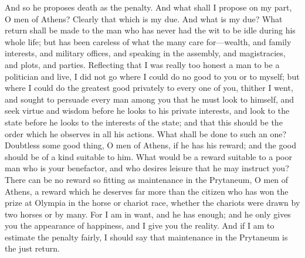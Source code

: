 \documentclass[11pt,letter]{article}
\begin{document}
\par  And so he proposes death as the penalty. And what shall I propose on my part, O men of Athens? Clearly that which is my due. And what is my due? What return shall be made to the man who has never had the wit to be idle during his whole life; but has been careless of what the many care for—wealth, and family interests, and military offices, and speaking in the assembly, and magistracies, and plots, and parties. Reflecting that I was really too honest a man to be a politician and live, I did not go where I could do no good to you or to myself; but where I could do the greatest good privately to every one of you, thither I went, and sought to persuade every man among you that he must look to himself, and seek virtue and wisdom before he looks to his private interests, and look to the state before he looks to the interests of the state; and that this should be the order which he observes in all his actions. What shall be done to such an one? Doubtless some good thing, O men of Athens, if he has his reward; and the good should be of a kind suitable to him. What would be a reward suitable to a poor man who is your benefactor, and who desires leisure that he may instruct you? There can be no reward so fitting as maintenance in the Prytaneum, O men of Athens, a reward which he deserves far more than the citizen who has won the prize at Olympia in the horse or chariot race, whether the chariots were drawn by two horses or by many. For I am in want, and he has enough; and he only gives you the appearance of happiness, and I give you the reality. And if I am to estimate the penalty fairly, I should say that maintenance in the Prytaneum is the just return.
\end{document}
